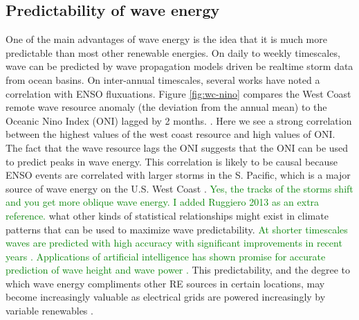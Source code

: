 \subsection{Predictability of wave energy}
One of the main advantages of wave energy is the idea that it is much more predictable than most other renewable energies. On daily to weekly timescales, wave can be predicted by wave propagation models driven be realtime storm data from ocean basins. On inter-annual timescales, several works have noted a correlation with ENSO fluxuations. Figure \ref{fig:wc-nino} compares the West Coast remote wave resource anomaly (the deviation from the annual mean) to the Oceanic Nino Index (ONI) lagged by 2 months. \cite{nationaloceanicandatmosphericadministrationOceanicNinoIndex2020}.
Here we see a strong correlation between the highest values of the west coast resource and high values of ONI. The fact that the wave resource lags the ONI suggests that the ONI can be used to predict peaks in wave energy. This correlation is likely to be causal because ENSO events are correlated with larger storms in the S. Pacific, which is a major source of wave energy on the U.S. West Coast \cite{andersonClimateIndexOptimized2018, yangCharacteristicsVariabilityNearshore2020,ruggerio_national_2013}.  \textcolor{green}{Yes, the tracks of the storms shift and you get more oblique wave energy. I added Ruggiero 2013 as an extra reference.}
what other kinds of statistical relationships might exist in climate patterns that can be used to maximize wave predictability. \textcolor{green}{At shorter timescales waves are predicted with high accuracy with significant improvements in recent years \citep{cavaleri_wave_2018}. Applications of artificial intelligence has shown promise for accurate prediction of wave height and wave power \citep[e.g.][]{cornejo-bueno_significant_2016}.} This predictability, and the degree to which wave energy compliments other RE sources in certain locations, may become increasingly valuable as electrical grids are powered increasingly by variable renewables \cite{parkinsonIntegratingOceanWave2015}.

